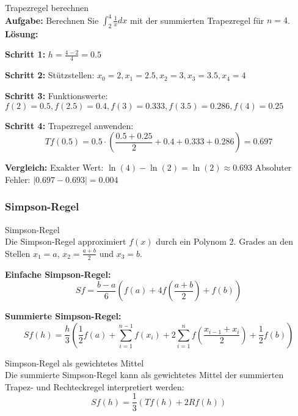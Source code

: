 \begin{example2}{Trapezregel berechnen}\\
\textbf{Aufgabe:} Berechnen Sie $\int_2^4 \frac{1}{x} dx$ mit der summierten Trapezregel für $n = 4$.
\tcblower
\textbf{Lösung:}

\textbf{Schritt 1:} $h = \frac{4-2}{4} = 0.5$

\textbf{Schritt 2:} Stützstellen: $x_0 = 2, x_1 = 2.5, x_2 = 3, x_3 = 3.5, x_4 = 4$

\textbf{Schritt 3:} Funktionswerte:
$f(2) = 0.5, f(2.5) = 0.4, f(3) = 0.333, f(3.5) = 0.286, f(4) = 0.25$

\textbf{Schritt 4:} Trapezregel anwenden:
$$Tf(0.5) = 0.5 \cdot \left(\frac{0.5 + 0.25}{2} + 0.4 + 0.333 + 0.286\right) = 0.697$$

\textbf{Vergleich:} Exakter Wert: $\ln(4) - \ln(2) = \ln(2) \approx 0.693$
Absoluter Fehler: $|0.697 - 0.693| = 0.004$
\end{example2}

\subsubsection{Simpson-Regel}

\begin{definition}{Simpson-Regel}\\
Die Simpson-Regel approximiert $f(x)$ durch ein Polynom 2. Grades an den Stellen $x_1 = a$, $x_2 = \frac{a+b}{2}$ und $x_3 = b$.

\textbf{Einfache Simpson-Regel:}
$$Sf = \frac{b-a}{6} \left(f(a) + 4f\left(\frac{a+b}{2}\right) + f(b)\right)$$

\textbf{Summierte Simpson-Regel:}
$$Sf(h) = \frac{h}{3} \left(\frac{1}{2}f(a) + \sum_{i=1}^{n-1} f(x_i) + 2\sum_{i=1}^{n} f\left(\frac{x_{i-1} + x_i}{2}\right) + \frac{1}{2}f(b)\right)$$
\end{definition}

\begin{concept}{Simpson-Regel als gewichtetes Mittel}\\
Die summierte Simpson-Regel kann als gewichtetes Mittel der summierten Trapez- und Rechteckregel interpretiert werden:
$$Sf(h) = \frac{1}{3}(Tf(h) + 2Rf(h))$$
\end{concept}

